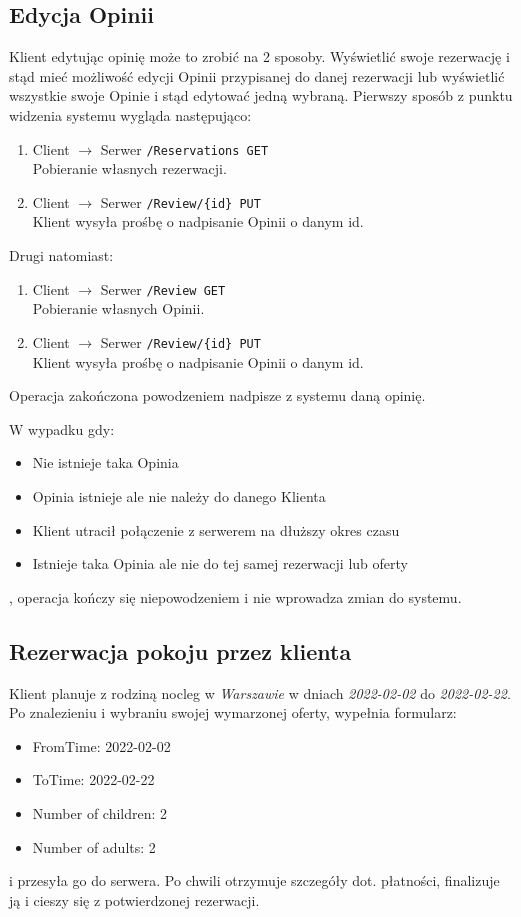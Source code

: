 \documentclass{article}
\begin{document}
\subsection{Edycja Opinii}
Klient edytując opinię może to zrobić na 2 sposoby. Wyświetlić swoje rezerwację i stąd mieć możliwość edycji Opinii przypisanej do danej rezerwacji lub wyświetlić wszystkie swoje Opinie i stąd edytować jedną wybraną.
Pierwszy sposób z punktu widzenia systemu wygląda następująco:
\begin{enumerate}
    \item Client $\rightarrow$  Serwer \texttt{/Reservations GET} \\
    Pobieranie własnych rezerwacji.
    \item Client $\rightarrow$ Serwer \texttt{/Review/\{id\} PUT}\\
    Klient wysyła prośbę o nadpisanie Opinii o danym id.
\end{enumerate}
Drugi natomiast:
\begin{enumerate}
    \item Client $\rightarrow$  Serwer \texttt{/Review GET} \\
    Pobieranie własnych Opinii.
    \item Client $\rightarrow$ Serwer \texttt{/Review/\{id\} PUT}\\
    Klient wysyła prośbę o nadpisanie Opinii o danym id.
\end{enumerate}
Operacja zakończona powodzeniem nadpisze z systemu daną opinię.

W wypadku gdy:
\begin{itemize}
    \item Nie istnieje taka Opinia
    \item Opinia istnieje ale nie należy do danego Klienta
    \item Klient utracił połączenie z serwerem na dłuższy okres czasu 
    \item Istnieje taka Opinia ale nie do tej samej rezerwacji lub oferty
\end{itemize}
, operacja kończy się niepowodzeniem i nie wprowadza zmian do systemu.

\subsection{Rezerwacja pokoju przez klienta}
Klient planuje z rodziną nocleg w \textit{Warszawie} w dniach \textit{2022-02-02} do \textit{2022-02-22}.
Po znalezieniu i wybraniu swojej wymarzonej oferty, wypełnia formularz:
\begin{itemize}
    \item FromTime: 2022-02-02
    \item ToTime: 2022-02-22
    \item Number of children: 2
    \item Number of adults: 2
\end{itemize}
i przesyła go do serwera. Po chwili otrzymuje szczegóły dot. płatności, finalizuje ją i cieszy się z potwierdzonej rezerwacji.
\end{document}
